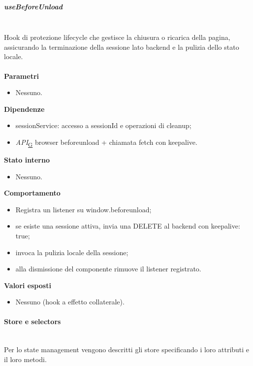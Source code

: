 \documentclass[a4paper,12pt]{article}
\begin{document}
                \subparagraph{useBeforeUnload}\mbox{}\\
                Hook di protezione lifecycle che gestisce la chiusura o ricarica della pagina, assicurando la terminazione della sessione lato backend e la pulizia dello stato locale.\\\\
                \textbf{Parametri}
                \begin{itemize}
                    \item Nessuno.
                \end{itemize}
                \textbf{Dipendenze}
                \begin{itemize}
                    \item {\ttfamily sessionService}: accesso a sessionId e operazioni di cleanup;
                    \item \textit{API}\textsubscript{\href{https://atlasteam9.github.io/Atlas/glossario.html\#API}{G}} browser {\ttfamily beforeunload} + chiamata {\ttfamily fetch} con {\ttfamily keepalive}.
                \end{itemize}
                \textbf{Stato interno}
                \begin{itemize}
                    \item Nessuno.
                \end{itemize}
                \textbf{Comportamento}
                \begin{itemize}
                    \item Registra un listener su {\ttfamily window.beforeunload};
                    \item se esiste una sessione attiva, invia una DELETE al backend con {\ttfamily keepalive: true};
                    \item invoca la pulizia locale della sessione;
                    \item alla dismissione del componente rimuove il listener registrato.
                \end{itemize}
                \textbf{Valori esposti}
                \begin{itemize}
                    \item Nessuno (hook a effetto collaterale).
                \end{itemize}

            \paragraph{Store e selectors}\mbox{}\\
            Per lo state management vengono descritti gli store specificando i loro attributi e il loro metodi.
\end{document}
